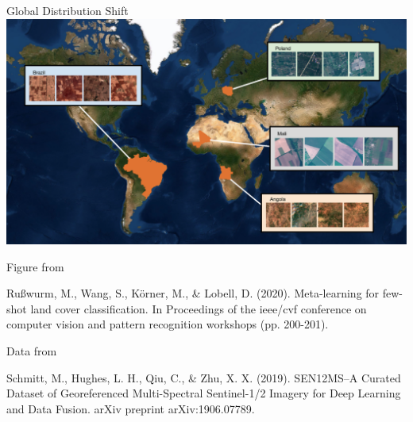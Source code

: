 \documentclass[11pt]{beamer}
\newcommand{\citeapa}[1]{ {\tiny#1\par} }
\begin{document}
	\begin{frame}{Global Distribution Shift}
		\includegraphics[width=\textwidth]{images/countries_globe}
		
		\vspace{0.5em}
		
		\scriptsize
		Figure from
		
		\citeapa{Rußwurm, M., Wang, S., Körner, M., \& Lobell, D. (2020). Meta-learning for few-shot land cover classification. In Proceedings of the ieee/cvf conference on computer vision and pattern recognition workshops (pp. 200-201).}
		
		\scriptsize
		Data from
		
		\citeapa{Schmitt, M., Hughes, L. H., Qiu, C., \& Zhu, X. X. (2019). SEN12MS--A Curated Dataset of Georeferenced Multi-Spectral Sentinel-1/2 Imagery for Deep Learning and Data Fusion. arXiv preprint arXiv:1906.07789.}
	\end{frame}
	
\end{document}
